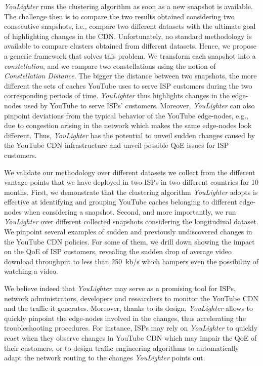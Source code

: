 \documentclass{acm_proc_article-sp}
\newcommand{\tool}{\textit{YouLighter}\xspace}
\newcommand{\distance}{\textit{Constellation Distance}\xspace}
\newcommand{\nodes}{{edge-nodes}\xspace}
\begin{document}
\tool runs the clustering algorithm as soon as a new snapshot is available. The challenge then is to compare the two results obtained considering two consecutive snapshots, i.e., compare two different datasets with the ultimate goal of highlighting changes in the CDN. Unfortunately, no standard methodology is available to compare clusters obtained from different datasets. Hence, we propose a generic framework that solves this problem. We transform each snapshot into a {\it constellation}, and we compare two constellations using the notion of \distance. The bigger the distance between two snapshots, the more different the sets of caches YouTube uses to serve ISP customers during the two corresponding periods of time.
\tool thus highlights changes in the \nodes used by YouTube to serve ISPs' customers. Moreover, \tool can also pinpoint deviations from the typical behavior of the YouTube \nodes, e.g., due to congestion arising in the network which makes the same \nodes look different. Thus, \tool has the potential to unveil sudden changes caused by the YouTube CDN infrastructure and unveil possible QoE issues for ISP customers.

We validate our methodology over different datasets we collect from the different vantage points that we have deployed in two ISPs in two different countries for 10 months.
First, we demonstrate that the clustering algorithm \tool adopts is effective at identifying and grouping YouTube caches belonging to different \nodes when considering a snapshot.
Second, and more importantly, we run \tool over different collected snapshots considering the longitudinal dataset. We pinpoint several examples of sudden and previously undiscovered changes in the YouTube CDN policies. For some of them, we drill down showing the impact on the QoE of ISP customers, revealing the sudden drop of average video download throughput to less than 250~kb/s which hampers even the possibility of watching a  video.

We believe indeed that \tool may serve as a promising tool for ISPs, network administrators, developers and researchers to monitor the YouTube CDN and the traffic it generates. Moreover, thanks to its design, \tool allows to quickly pinpoint the \nodes involved in the changes, thus accelerating the troubleshooting procedures. For instance, ISPs may rely on \tool to quickly react when they observe changes in YouTube CDN which may impair the QoE of their customers, or to design traffic engineering algorithms to automatically adapt the network routing to the changes \tool points out.
\end{document}
